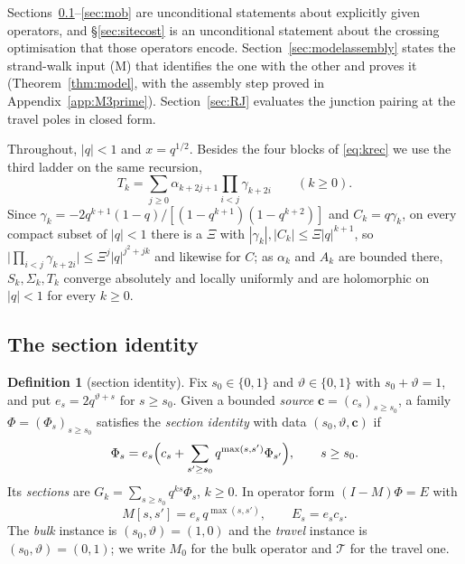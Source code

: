 \documentclass[11pt]{article}
\theoremstyle{plain}
\theoremstyle{definition}
\newtheorem{definition}[theorem]{Definition}
\theoremstyle{remark}
\begin{document}
Sections~\ref{sec:sect}--\ref{sec:mob} are unconditional statements about explicitly given
operators, and \S\ref{sec:sitecost} is an unconditional statement about the crossing optimisation
that those operators encode. Section~\ref{sec:modelassembly} states the strand-walk input
\textup{(M)} that identifies the one with the other and proves it (Theorem~\ref{thm:model}, with
the assembly step proved in Appendix~\ref{app:M3prime}). Section~\ref{sec:RJ} evaluates the junction
pairing at the travel poles in closed form.

Throughout, $|q|<1$ and $x=q^{1/2}$. Besides the four blocks of \eqref{eq:krec} we use the third
ladder on the same recursion,
\begin{equation}\label{eq:Tladder}
   T_k=\sum_{j\ge0}\alpha_{k+2j+1}\prod_{i<j}\gamma_{k+2i}\qquad(k\ge0).
\end{equation}
Since $\gamma_k=-2q^{k+1}(1-q)/[(1-q^{k+1})(1-q^{k+2})]$ and $C_k=q\gamma_k$, on every compact
subset of $|q|<1$ there is a $\Xi$ with $|\gamma_k|,|C_k|\le\Xi|q|^{k+1}$, so
$\bigl|\prod_{i<j}\gamma_{k+2i}\bigr|\le\Xi^{j}|q|^{j^2+jk}$ and likewise for $C$; as
$\alpha_k$ and $A_k$ are bounded there, $S_k,\Sigma_k,T_k$ converge absolutely and locally
uniformly and are holomorphic on $|q|<1$ for every $k\ge0$.

\subsection{The section identity}\label{sec:sect}

\begin{definition}[section identity]\label{def:model}
Fix $s_0\in\{0,1\}$ and $\vartheta\in\{0,1\}$ with $s_0+\vartheta=1$, and put
$e_s=2q^{\vartheta+s}$ for $s\ge s_0$. Given a bounded \emph{source} $\mathbf c=(c_s)_{s\ge s_0}$,
a family $\Phi=(\Phi_s)_{s\ge s_0}$ satisfies the \emph{section identity} with data
$(s_0,\vartheta,\mathbf c)$ if
\begin{equation}\label{eq:sectionid}
   \Phi_s=e_s\Bigl(c_s+\sum_{s'\ge s_0}q^{\max(s,s')}\Phi_{s'}\Bigr),\qquad s\ge s_0 .
\end{equation}
Its \emph{sections} are $G_k=\sum_{s\ge s_0}q^{ks}\Phi_s$, $k\ge0$. In operator form
$(I-M)\Phi=E$ with
\begin{equation}\label{eq:transfer}
   M[s,s']=e_s\,q^{\max(s,s')},\qquad E_s=e_sc_s .
\end{equation}
The \emph{bulk} instance is $(s_0,\vartheta)=(1,0)$ and the \emph{travel} instance is
$(s_0,\vartheta)=(0,1)$; we write $M_0$ for the bulk operator and $\mathcal T$ for the travel one.
\end{definition}
\end{document}
